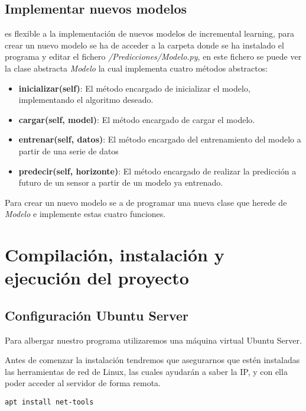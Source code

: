 \subsection{Implementar nuevos modelos}

\nombrePrograma es flexible a la implementación de nuevos modelos de incremental learning, para crear un nuevo modelo se ha de acceder a la carpeta donde se ha instalado el programa y editar el fichero \textit{/Predicciones/Modelo.py}, en este fichero se puede ver la clase abstracta \textit{Modelo} la cual implementa cuatro métodos abstractos:
\begin{itemize}
    \item \textbf{inicializar(self)}: El método encargado de inicializar  el modelo, implementando el algoritmo deseado.
    
    \item \textbf{cargar(self, model)}:  El método encargado de cargar el modelo.
    
    \item \textbf{entrenar(self, datos)}: El método encargado del entrenamiento del modelo a partir de una serie de datos
    \item \textbf{predecir(self, horizonte)}: El método encargado de realizar la predicción a futuro de un sensor a partir de un modelo ya entrenado.
\end{itemize}

Para crear un nuevo modelo se a de programar una nueva clase que herede de \textit{Modelo} e implemente estas cuatro funciones.

\section{Compilación, instalación y ejecución del proyecto}

\subsection{Configuración Ubuntu Server}

Para albergar nuestro programa utilizaremos una máquina virtual Ubuntu Server.

Antes de comenzar la instalación tendremos que asegurarnos que estén instaladas las herramientas de red de Linux, las cuales ayudarán a saber la IP, y con ella poder acceder al servidor de forma remota.


\begin{lstlisting}[frame=single] 
apt install net-tools
\end{lstlisting}

